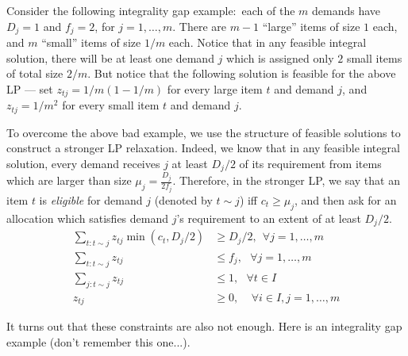 Consider the following integrality gap example:~each of the $m$ demands have $D_j = 1$ and $f_j = 2$, for $j=1, \ldots, m$. There are $m-1$ ``large'' items of size $1$ each,
 and $m$ ``small'' items of size $1/m$ each. Notice that in any feasible integral solution, there will be at least one demand $j$ which is assigned only $2$ small items of total size $2/m$. But notice that the following solution is feasible for the above LP --- set $z_{tj} = 1/m (1-1/m)$ for every large item $t$ and demand $j$, and $z_{tj} = 1/m^2$ for every small item $t$ and demand $j$.

To overcome the above bad example, we use the structure of feasible solutions to construct a stronger LP relaxation. Indeed, we know that in any feasible integral solution, every demand receives $j$ at least $D_j/2$ of its requirement from items which are larger than size $\mu_j = \frac{D_j}{2f_j}$. Therefore, in the stronger LP, we say that an item $t$ is \emph{eligible} for demand $j$ (denoted by $t \sim j$) iff $c_t \geq \mu_j$, and then ask for an allocation which satisfies demand $j$'s requirement to an extent of at least $D_j/2$.
\begin{align*}
\sum_{t: t \sim j} z_{tj} \min(c_t, D_j/2) & \geq D_j/2, \ \  \forall j=1, \ldots, m \\
\sum_{t: t \sim j} z_{tj} & \leq f_j, \ \ \ \forall j = 1, \ldots, m \\
\sum_{j: t \sim j} z_{tj} & \leq 1,  \ \ \ \forall t \in I\\
z_{tj} & \geq 0, \ \ \ \ \ \forall i \in I,j=1, \ldots, m
\end{align*}

It turns out that these constraints are also not enough. Here is an integrality gap example (don't remember this one...).

\newcommand{\barD}{{\bar D}}

